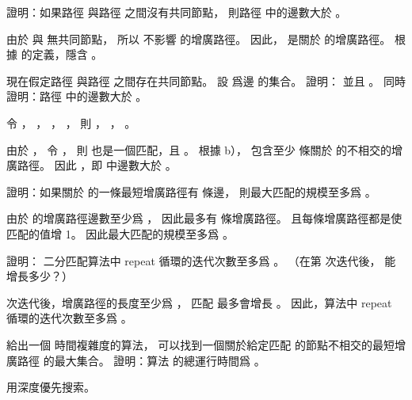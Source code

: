 \startigBase[continue]\startitem
證明：如果路徑  與路徑  之間沒有共同節點，
則路徑  中的邊數大於 。
\stopitem\stopigBase

\startANSWER
由於  與  無共同節點，
所以  不影響  的增廣路徑。
因此，  是關於  的增廣路徑。
根據  的定義，隱含 。
\stopANSWER

\startigBase[continue]\startitem
現在假定路徑  與路徑  之間存在共同節點。
設  爲邊  的集合。
證明：  並且 。
同時證明：路徑  中的邊數大於 。
\stopitem\stopigBase

\startANSWER
令 ，
 ，
 ， ，
則 ， ，
 。

由於 ，
令 ，
則  也是一個匹配，且 。
根據 b），  包含至少  條關於  的不相交的增廣路徑。
因此 ，即  中邊數大於 。
\stopANSWER

\startigBase[continue]\startitem
證明：如果關於  的一條最短增廣路徑有  條邊，
則最大匹配的規模至多爲 。
\stopitem\stopigBase

\startANSWER
由於  的增廣路徑邊數至少爲 ，
因此最多有  條增廣路徑。
且每條增廣路徑都是使匹配的值增 1。
因此最大匹配的規模至多爲 。
\stopANSWER

\startigBase[continue]\startitem
證明：  二分匹配算法中 {\EMP repeat} 循環的迭代次數至多爲 。
（\hint 在第  次迭代後，  能增長多少？）
\stopitem\stopigBase

\startANSWER
{} 次迭代後，增廣路徑的長度至少爲 ，
匹配  最多會增長 。
因此，算法中 {\EMP repeat} 循環的迭代次數至多爲 。
\stopANSWER

\startigBase[continue]\startitem
給出一個  時間複雜度的算法，
可以找到一個關於給定匹配  的節點不相交的最短增廣路徑  的最大集合。
證明：算法  的總運行時間爲 。
\stopitem\stopigBase

\startANSWER
用深度優先搜索。
\stopANSWER

\stopPROBLEM

\stopsubject%
